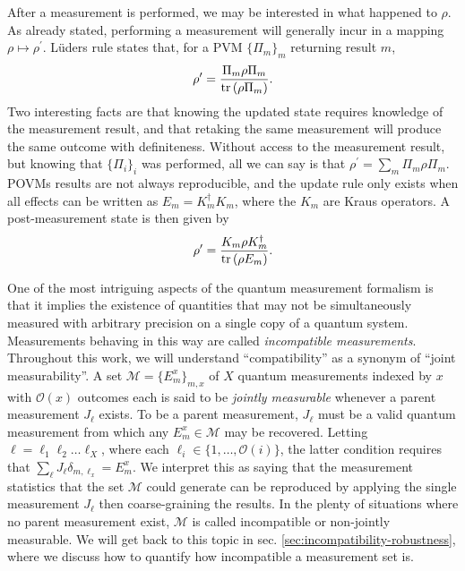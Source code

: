 		After a measurement is performed, we may be interested in what happened to $\rho$. As already stated, performing a measurement will generally incur in a mapping $\rho \mapsto \rho^\prime$. Lüders rule states that, for a PVM $\{ \Pi_m \}_m$ returning result $m$,
		\begin{equation}
			\rho^\prime = \frac{\Pi_m \rho \Pi_m}{\text{tr}\left( \rho \Pi_m \right)} .
			\label{eq:luders-rule}
		\end{equation}
		Two interesting facts are that knowing the updated state requires knowledge of the measurement result, and that retaking the same measurement will produce the same outcome with definiteness. Without access to the measurement result, but knowing that $\{ \Pi_i \}_i$ was performed, all we can say is that $\rho^\prime = \sum_m \Pi_m \rho \Pi_m$. POVMs results are not always reproducible, and the update rule only exists when all effects can be written as $E_m = K_m^\dagger K_m$, where the $K_m$ are Kraus operators. A post-measurement state is then given by
		$$
			\rho^\prime = \frac{K_m \rho K_m^\dagger}{\text{tr}\left( \rho E_m \right)} .
		$$
		
		One of the most intriguing aspects of the quantum measurement formalism is that it implies the existence of quantities that may not be simultaneously measured with arbitrary precision on a single copy of a quantum system. Measurements behaving in this way are called \emph{incompatible measurements}. Throughout this work, we will understand ``compatibility'' as a synonym of ``joint measurability''. A set $\mathcal{M} = \{E_m^x \}_{m, x}$ of $X$ quantum measurements indexed by $x$ with $\mathcal{O}(x)$ outcomes each is said to be \emph{jointly measurable} whenever a parent measurement $J_\ell$ exists. To be a parent measurement, $J_\ell$ must be a valid quantum measurement from which any $E_m^x \in \mathcal{M}$ may be recovered. Letting $\ell = \ell_1\ell_2\ldots\ell_X$, where each $\ell_i \in \{ 1, \ldots, \mathcal{O}(i) \}$, the latter condition requires that $\sum_\ell J_\ell \delta_{m, \ell_x} = E_m^x$. We interpret this as saying that the measurement statistics that the set $\mathcal{M}$ could generate can be reproduced by applying the single measurement $J_\ell$ then coarse-graining the results. In the plenty of situations where no parent measurement exist, $\mathcal{M}$ is called incompatible or non-jointly measurable. We will get back to this topic in sec. \ref{sec:incompatibility-robustness}, where we discuss how to quantify how incompatible a measurement set is.
		
